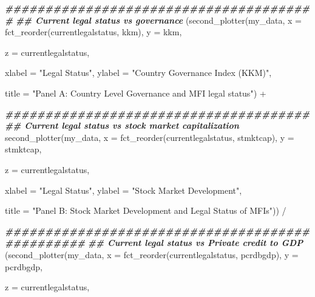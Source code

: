 \documentclass[a4paper,nobind]{templates/ociamthesis}
\newenvironment{Shaded}{\begin{snugshade}}{\end{snugshade}}
\newcommand{\AttributeTok}[1]{\textcolor[rgb]{0.77,0.63,0.00}{#1}}
\newcommand{\DocumentationTok}[1]{\textcolor[rgb]{0.56,0.35,0.01}{\textbf{\textit{#1}}}}
\newcommand{\FunctionTok}[1]{\textcolor[rgb]{0.00,0.00,0.00}{#1}}
\newcommand{\NormalTok}[1]{#1}
\newcommand{\SpecialCharTok}[1]{\textcolor[rgb]{0.00,0.00,0.00}{#1}}
\newcommand{\StringTok}[1]{\textcolor[rgb]{0.31,0.60,0.02}{#1}}
\renewenvironment{Shaded}
{
  \vspace{10pt}%
  \begin{snugshade}%
}{%
  \end{snugshade}%
  \vspace{8pt}%
}
\begin{document}
\begin{Shaded}
\begin{Highlighting}[]
\DocumentationTok{\#\#\#\#\#\#\#\#\#\#\#\#\#\#\#\#\#\#\#\#\#\#\#\#\#\#\#\#\#\#\#\#\#\#\#\#\#\#\#}
\DocumentationTok{\#\# Current legal status vs governance}
\NormalTok{(}\FunctionTok{second\_plotter}\NormalTok{(my\_data, }\AttributeTok{x =} \FunctionTok{fct\_reorder}\NormalTok{(currentlegalstatus, kkm), }\AttributeTok{y =}\NormalTok{ kkm, }
               
               \AttributeTok{z =}\NormalTok{ currentlegalstatus, }
               
               \AttributeTok{xlabel =} \StringTok{"Legal Status"}\NormalTok{, }\AttributeTok{ylabel =} \StringTok{"Country Governance Index (KKM)"}\NormalTok{, }
               
               \AttributeTok{title =} \StringTok{"Panel A: Country Level Governance and MFI legal status"}\NormalTok{) }\SpecialCharTok{+}



\DocumentationTok{\#\#\#\#\#\#\#\#\#\#\#\#\#\#\#\#\#\#\#\#\#\#\#\#\#\#\#\#\#\#\#\#\#\#\#\#\#\#}
\DocumentationTok{\#\# Current legal status vs stock market capitalization}
\FunctionTok{second\_plotter}\NormalTok{(my\_data, }\AttributeTok{x =} \FunctionTok{fct\_reorder}\NormalTok{(currentlegalstatus, stmktcap), }\AttributeTok{y =}\NormalTok{ stmktcap, }
               
               \AttributeTok{z =}\NormalTok{ currentlegalstatus, }
               
               \AttributeTok{xlabel =} \StringTok{"Legal Status"}\NormalTok{, }\AttributeTok{ylabel =} \StringTok{"Stock Market Development"}\NormalTok{, }
               
               \AttributeTok{title =} \StringTok{"Panel B: Stock Market Development and Legal Status of MFIs"}\NormalTok{)) }\SpecialCharTok{/}




\DocumentationTok{\#\#\#\#\#\#\#\#\#\#\#\#\#\#\#\#\#\#\#\#\#\#\#\#\#\#\#\#\#\#\#\#\#\#\#\#\#\#\#\#\#\#\#\#\#\#\#\#}
\DocumentationTok{\#\# Current legal status vs Private credit to GDP}
\NormalTok{(}\FunctionTok{second\_plotter}\NormalTok{(my\_data, }\AttributeTok{x =} \FunctionTok{fct\_reorder}\NormalTok{(currentlegalstatus, pcrdbgdp), }\AttributeTok{y =}\NormalTok{ pcrdbgdp, }
               
               \AttributeTok{z =}\NormalTok{ currentlegalstatus, }
               

\end{Highlighting}
\end{Shaded}
\end{document}
